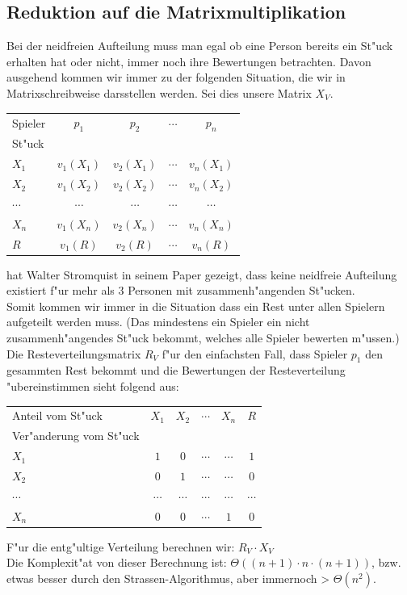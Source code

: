 \documentclass[11pt, a4paper, twoside]{article}
\numberwithin{equation}{section}
\begin{document}
\subsection{Reduktion auf die Matrixmultiplikation}
Bei der neidfreien Aufteilung muss man egal ob eine Person bereits ein St"uck erhalten hat oder nicht, immer noch ihre Bewertungen betrachten. Davon ausgehend kommen wir immer zu der folgenden Situation, die wir in Matrixschreibweise darsstellen werden. Sei dies unsere Matrix $X_V$.\\
\newline
\begin{tabular}{lcccc}
Spieler& $p_1$&$p_2$&$\cdots$&$p_n$\\
St"uck&&&&\\
$X_1$&$v_1(X_1)$&$v_2(X_1)$&$\cdots$&$v_n(X_1)$\\
$X_2$&$v_1(X_2)$&$v_2(X_2)$&$\cdots$&$v_n(X_2)$\\
$\cdots$&$\cdots$&$\cdots$&$\cdots$&$\cdots$\\
$X_n$&$v_1(X_n)$&$v_2(X_n)$&$\cdots$&$v_n(X_n)$\\
$R$&$v_1(R)$&$v_2(R)$&$\cdots$&$v_n(R)$\\
\end{tabular}
\newline
\newline
{} hat Walter Stromquist in seinem Paper gezeigt, dass keine neidfreie Aufteilung existiert f"ur mehr als 3 Personen mit zusammenh"angenden St"ucken.\\ Somit kommen wir immer in die Situation dass ein Rest unter allen Spielern aufgeteilt werden muss. (Das mindestens ein Spieler ein nicht zusammenh"angendes St"uck bekommt, welches alle Spieler bewerten m"ussen.) Die Resteverteilungsmatrix $R_V$ f"ur den einfachsten Fall, dass Spieler $p_1$ den gesammten Rest bekommt und die Bewertungen der Resteverteilung "ubereinstimmen sieht folgend aus:\\ 
\newline
\begin{tabular}{lccccc}
Anteil vom St"uck& $X_1$&$X_2$&$\cdots$&$X_n$&$R$\\
Ver"anderung vom St"uck&&&&&\\
$X_1$&$1$&$0$&$\cdots$&$\cdots$&$1$\\
$X_2$&$0$&$1$&$\cdots$&$\cdots$&$0$\\
$\cdots$&$\cdots$&$\cdots$&$\cdots$&$\cdots$&$\cdots$\\
$X_n$&$0$&$0$&$\cdots$&$1$&$0$\\
\end{tabular}
\newline
\newline
\newline
F"ur die entg"ultige Verteilung berechnen wir: $R_V\cdot X_V$\\
Die Komplexit"at von dieser Berechnung ist: $\Theta((n+1)\cdot n \cdot (n+1))$, bzw. etwas besser durch den Strassen-Algorithmus, aber immernoch > $\Theta(n^2)$. 
\newpage
\end{document}
